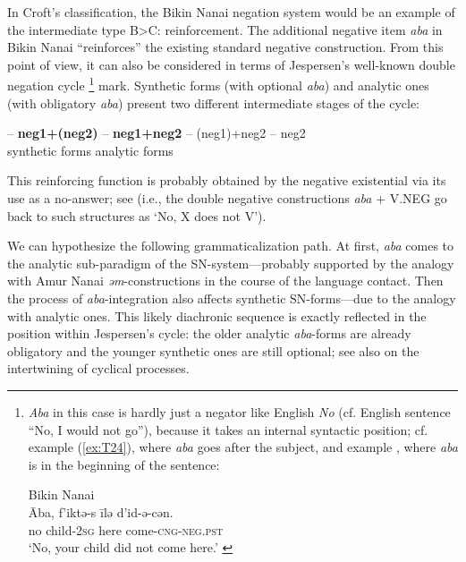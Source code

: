 \documentclass[output=paper,colorlinks,citecolor=brown]{langscibook}
\begin{document}
In Croft’s \citeyearpar{Croft1991} classification, the Bikin Nanai negation system would be an example of the intermediate type B>C: reinforcement. The additional negative item \textit{aba} in Bikin Nanai “reinforces” the existing standard negative construction. From this point of view, it can also be considered in terms of Jespersen’s well-known double negation cycle \citep{Jespersen1917, Auwera2009, Auwera2010}\footnote{\textit{Aba}
    in this case is hardly just a negator like English \textit{No} (cf. English sentence “No, I would not go”), because it takes an internal syntactic position; cf. example (\ref{ex:T24}), where \textit{aba} goes after the subject, and example , where \textit{aba} is in the beginning of the sentence:

    \ea Bikin Nanai \label{ex:T-iii}\\
            \gll Āba,	f'iktə-s		īlə		d'id-ə-cən.\\
            no		child-\textsc{2sg}	here	come-\textsc{cng-neg.pst}\\
            \glt  `No, your child did not come here.' \citep[52]{sem1976a}
    \zlast
}
mark. Synthetic forms (with optional \textit{aba}) and analytic ones (with obligatory \textit{aba}) present two different intermediate stages of the cycle:


\let\eachwordone=\upshape
\begin{exe}
    \ex
     {–} \textbf{neg1+(neg2)} – \textbf{neg1+neg2} – (neg1)+neg2 – neg2\\
         { }    { } {synthetic forms}   {} {analytic forms}\\
\end{exe}
\let\eachwordone=\itshape


This reinforcing function is probably obtained by the negative existential via its use as a no-answer; see  (i.e., the double negative constructions \textit{aba} + V.NEG go back to such structures as ‘No, X does not V’).

We can hypothesize the following grammaticalization path. At first, \textit{aba} comes to the analytic sub-paradigm of the SN-system—probably supported by the analogy with Amur Nanai \textit{əm}-constructions in the course of the language contact. Then the process of \textit{aba}-integration also affects synthetic SN-forms—due to the analogy with analytic ones. This likely diachronic sequence is exactly reflected in the position within Jespersen’s cycle: the older analytic \textit{aba}-forms are already obligatory and the younger synthetic ones are still optional; see also  on the intertwining of cyclical processes.
\end{document}
